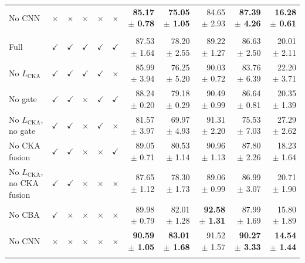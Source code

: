 \documentclass[10pt]{article}
\begin{document}
{\begin{longtable}{lccccc rrrrr}
No CNN & $\times$ & $\times$ & $\times$ & $\times$ & $\times$ & \textbf{85.17 $\pm$ 0.78} & \textbf{75.05 $\pm$ 1.05} & 84.65 $\pm$ 2.93 & \textbf{87.39 $\pm$ 4.26} & \textbf{16.28 $\pm$ 0.61} \\
\addlinespace[4pt]
\multicolumn{11}{l}{\textit{Source: USOVA $\rightarrow$ Target: OVATUS}} \\
\midrule
Full & $\checkmark$ & $\checkmark$ & $\checkmark$ & $\checkmark$ & $\checkmark$ & 87.53 $\pm$ 1.64 & 78.20 $\pm$ 2.55 & 89.22 $\pm$ 1.27 & 86.63 $\pm$ 2.50 & 20.01 $\pm$ 2.11 \\
No $L_{\mathrm{CKA}}$ & $\checkmark$ & $\checkmark$ & $\checkmark$ & $\checkmark$ & $\times$ & 85.99 $\pm$ 3.94 & 76.25 $\pm$ 5.20 & 90.03 $\pm$ 0.72 & 83.76 $\pm$ 6.39 & 22.20 $\pm$ 3.71 \\
No gate & $\checkmark$ & $\checkmark$ & $\times$ & $\checkmark$ & $\checkmark$ & 88.24 $\pm$ 0.20 & 79.18 $\pm$ 0.29 & 90.49 $\pm$ 0.99 & 86.64 $\pm$ 0.81 & 20.35 $\pm$ 1.39 \\
No $L_{\mathrm{CKA}}$, no gate & $\checkmark$ & $\checkmark$ & $\times$ & $\checkmark$ & $\times$ & 81.57 $\pm$ 3.97 & 69.97 $\pm$ 4.93 & 91.31 $\pm$ 2.20 & 75.53 $\pm$ 7.03 & 27.29 $\pm$ 2.62 \\
No CKA fusion & $\checkmark$ & $\checkmark$ & $\times$ & $\times$ & $\checkmark$ & 89.05 $\pm$ 0.71 & 80.53 $\pm$ 1.14 & 90.96 $\pm$ 1.13 & 87.80 $\pm$ 2.26 & 18.23 $\pm$ 1.64 \\
No $L_{\mathrm{CKA}}$, no CKA fusion & $\checkmark$ & $\checkmark$ & $\times$ & $\times$ & $\times$ & 87.65 $\pm$ 1.12 & 78.30 $\pm$ 1.73 & 89.06 $\pm$ 0.99 & 86.99 $\pm$ 3.07 & 20.71 $\pm$ 1.90 \\
No CBA & $\checkmark$ & $\times$ & $\times$ & $\times$ & $\times$ & 89.98 $\pm$ 0.79 & 82.01 $\pm$ 1.28 & \textbf{92.58 $\pm$ 1.31} & 87.99 $\pm$ 1.69 & 15.80 $\pm$ 1.89 \\
No CNN & $\times$ & $\times$ & $\times$ & $\times$ & $\times$ & \textbf{90.59 $\pm$ 1.05} & \textbf{83.01 $\pm$ 1.68} & 91.52 $\pm$ 1.57 & \textbf{90.27 $\pm$ 3.33} & \textbf{14.54 $\pm$ 1.44} \\
\addlinespace[4pt]
\end{longtable}
}
\end{document}
